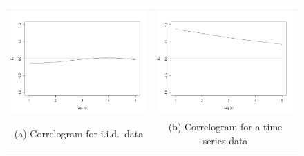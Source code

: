\begin{itemize}
\begin{figure}[ht!]
\begin{center}
\begin{tabular}{cc}
\includegraphics[scale=0.25]{./figures/PreliminariesCorrelogramGaussian} &
\includegraphics[scale=0.25]{./figures/PreliminariesCorrelogramTimeSerie} \\
\small (a) Correlogram for i.i.d.\ data & \small (b) Correlogram for a time series data \\

\end{tabular}
\end{center}
\end{figure}
\end{itemize}
